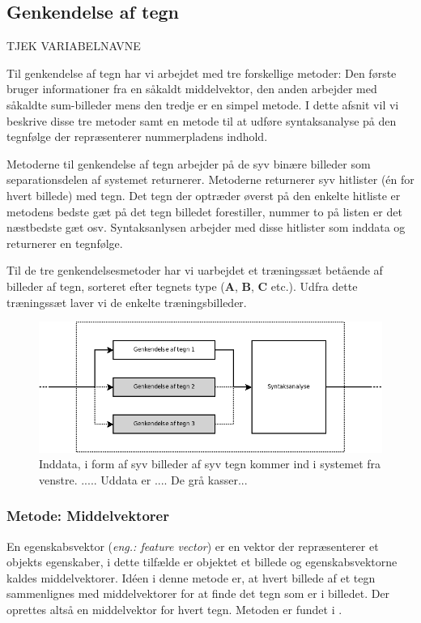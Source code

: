 \subsection{Genkendelse af tegn}

TJEK VARIABELNAVNE

\label{sec_monster}
Til genkendelse af tegn har vi arbejdet med tre forskellige metoder: Den første bruger informationer fra en såkaldt middelvektor, den anden arbejder med såkaldte sum-billeder mens den tredje er en simpel metode. I dette afsnit vil vi beskrive disse tre metoder samt en metode til at udføre syntaksanalyse på den tegnfølge der repræsenterer nummerpladens indhold.

Metoderne til genkendelse af tegn arbejder på de syv binære billeder som separationsdelen af systemet returnerer. Metoderne returnerer syv hitlister (én for hvert billede) med tegn. Det tegn der optræder øverst på den enkelte hitliste er metodens bedste gæt på det tegn billedet forestiller, nummer to på listen er det næstbedste gæt osv. Syntaksanlysen arbejder med disse hitlister som inddata og returnerer en tegnfølge.

Til de tre genkendelsesmetoder har vi uarbejdet et træningssæt betående af billeder af tegn, sorteret efter tegnets type (\textbf{A}, \textbf{B}, \textbf{C} etc.). Udfra dette træningssæt laver vi de enkelte træningsbilleder.

\begin{figure}[htp]
\centering
\includegraphics[width=12cm]{system/illu/dia_trin3.png} 
\caption{Inddata, i form af syv billeder af syv tegn kommer ind i systemet fra venstre. ..... Uddata er .... De grå kasser...}
\label{fig:dia_trin3}
\end{figure}

\subsubsection{Metode: Middelvektorer}
En egenskabsvektor (\textit{eng.: feature vector}) er en vektor der repræsenterer et objekts egenskaber, i dette tilfælde er objektet et billede og egenskabsvektorne kaldes middelvektorer. Idéen i denne metode er, at hvert billede af et tegn sammenlignes med middelvektorer for at finde det tegn som er i billedet. Der oprettes altså en middelvektor for hvert tegn. Metoden er fundet i \cite{arth}.

